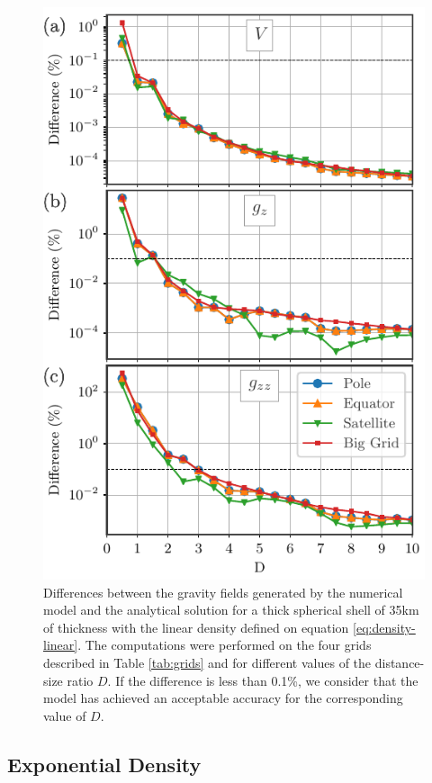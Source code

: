 \documentclass[extra]{gji}
\begin{document}
\begin{figure}
\centering
\includegraphics[width=0.9\linewidth]{figures/Dlinear-thick-differences.pdf}
\caption{
    Differences between the gravity fields generated by the numerical model and the analytical solution for a thick spherical shell of 35km of thickness with the linear density defined on equation \ref{eq:density-linear}. The computations were performed on the four grids described in Table \ref{tab:grids} and for different values of the distance-size ratio $D$. If the difference is less than 0.1\%, we consider that the model has achieved an acceptable accuracy for the corresponding value of $D$.
}
\label{fig:D-linear-thick}
\end{figure}


\subsection{Exponential Density}
\end{document}
